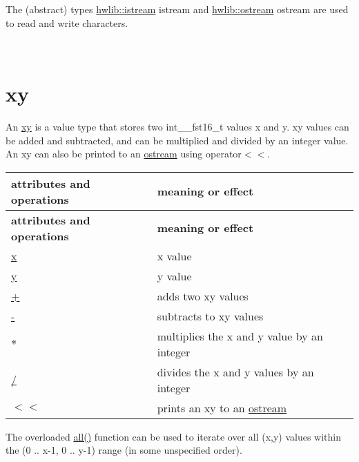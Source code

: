 The (abstract) types \hyperlink{classhwlib_1_1istream}{hwlib\+::istream} istream and \hyperlink{classhwlib_1_1ostream}{hwlib\+::ostream} ostream are used to read and write characters.

~\newline
 

\hypertarget{graphics_xy}{}\section{xy}\label{graphics_xy}
An \hyperlink{classhwlib_1_1xy}{xy} is a value type that stores two int\+\_\+\+\_\+fst16\+\_\+t values x and y. xy values can be added and subtracted, and can be multiplied and divided by an integer value. An xy can also be printed to an \hyperlink{classhwlib_1_1ostream}{ostream} using operator$<$$<$.

\tabulinesep=1mm
\begin{longtabu} spread 0pt [c]{*{2}{|X[-1]}|}
\hline
\rowcolor{\tableheadbgcolor}\textbf{ attributes and operations }&\textbf{ meaning or effect  }\\
\endfirsthead
\hline
\endfoot
\hline
\rowcolor{\tableheadbgcolor}\textbf{ attributes and operations }&\textbf{ meaning or effect  }\\
\endhead
\hyperlink{classhwlib_1_1xy_a7f7c8b3888ce9d2ba014b8d36a86abb1}{x} &x value \\
\hyperlink{classhwlib_1_1xy_a6a665ea6d31ce71d9f3a533986744086}{y} &y value \\
\hyperlink{classhwlib_1_1xy_ad653d6eed097bcab167f5da86c48da5e}{+} &adds two xy values \\
\hyperlink{classhwlib_1_1xy_ad653d6eed097bcab167f5da86c48da5e}{-\/} &subtracts to xy values \\
\hyperlink{classhwlib_1_1xy_ad653d6eed097bcab167f5da86c48da5e}{$\ast$} &multiplies the x and y value by an integer \\
\hyperlink{classhwlib_1_1xy_aedcbff14cac98d6f7fe5d96bd26f2d6f}{/} &divides the x and y values by an integer \\
$<$$<$ &prints an xy to an \hyperlink{classhwlib_1_1ostream}{ostream} \\
\end{longtabu}
The overloaded \hyperlink{structxy_af0ac2823653fbb02e47de4315fb20a49}{all()} function can be used to iterate over all (x,y) values within the (0 .. x-\/1, 0 .. y-\/1) range (in some unspecified order).

